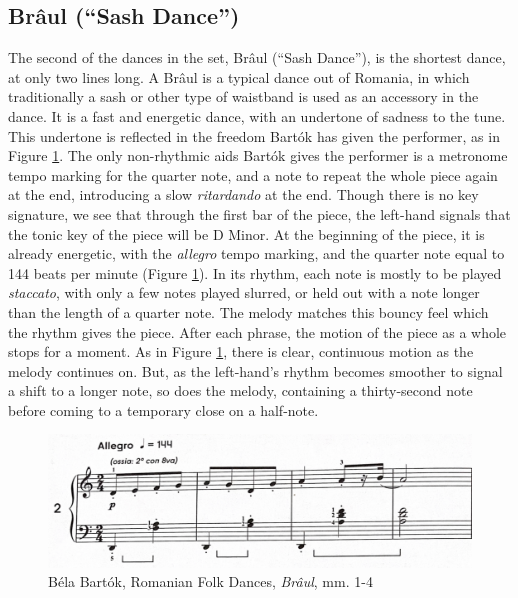\subsection{Brâul (``Sash Dance'')}

The second of the dances in the set, Brâul (``Sash Dance''), is the shortest dance, at only two lines long. A Brâul is a typical dance out of Romania, in which traditionally a sash or other type of waistband is used as an accessory in the dance. It is a fast and energetic dance, with an undertone of sadness to the tune. This undertone is reflected in the freedom Bartók has given the performer, as in Figure \ref{fig:bartok-waistband-dance-interpretation}\autocite{Lung_2016}. The only non-rhythmic aids Bartók gives the performer is a metronome tempo marking for the quarter note, and a note to repeat the whole piece again at the end, introducing a slow \textit{ritardando} at the end. Though there is no key signature, we see that through the first bar of the piece, the left-hand signals that the tonic key of the piece will be D Minor. At the beginning of the piece, it is already energetic, with the \textit{allegro} tempo marking, and the quarter note equal to 144 beats per minute (Figure \ref{fig:bartok-waistband-dance-interpretation}\autocite{Lung_2016}). In its rhythm, each note is mostly to be played \textit{staccato}, with only a few notes played slurred, or held out with a note longer than the length of a quarter note. The melody matches this bouncy feel which the rhythm gives the piece. After each phrase, the motion of the piece as a whole stops for a moment. As in Figure \ref{fig:bartok-waistband-dance-interpretation}\autocite{Lung_2016}, there is clear, continuous motion as the melody continues on. But, as the left-hand's rhythm becomes smoother to signal a shift to a longer note, so does the melody, containing a thirty-second note before coming to a temporary close on a half-note. 

\begin{figure}[h]
  \centering
  \includegraphics[width=\textwidth]{figures/bartok-waistband-dance-tempo-marking-and-dynamic.jpg}
  \caption{Béla Bartók, Romanian Folk Dances, \textit{Brâul}, mm. 1-4}
  \label{fig:bartok-waistband-dance-interpretation}
\end{figure}

